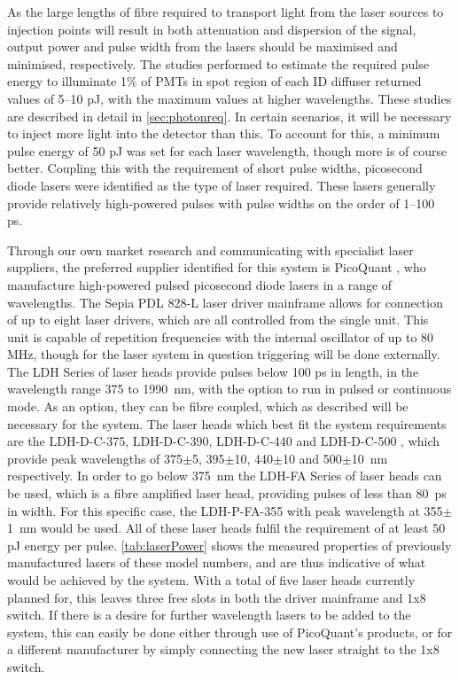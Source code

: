 \documentclass[a4paper,11pt]{article}
\begin{document}
As the large lengths of fibre required to transport light from the laser sources to injection points will result in both attenuation and dispersion of the signal, output power and pulse width from the lasers should be maximised and minimised, respectively. The studies performed to estimate the required pulse energy to illuminate 1\% of PMTs in spot region of each ID diffuser returned values of 5--10 pJ, with the maximum values at higher wavelengths. These studies are described in detail in \cref{sec:photonreq}. In certain scenarios, it will be necessary to inject more light into the detector than this. To account for this, a minimum pulse energy of 50 pJ was set for each laser wavelength, though more is of course better. Coupling this with the requirement of short pulse widths, picosecond diode lasers were identified as the type of laser required. These lasers generally provide relatively high-powered pulses with pulse widths on the order of 1--100 ps.

Through our own market research and communicating with specialist laser suppliers, the preferred supplier identified for this system is PicoQuant \cite{bib:picoquant}, who manufacture high-powered pulsed picosecond diode lasers in a range of wavelengths. The Sepia PDL 828-L laser driver mainframe \cite{bib:laserdriver} allows for connection of up to eight laser drivers, which are all controlled from the single unit. This unit is capable of repetition frequencies with the internal oscillator of up to 80 MHz, though for the laser system in question triggering will be done externally. The LDH Series of laser heads \cite{bib:laserhead} provide pulses below 100 ps in length, in the wavelength range 375 to 1990~nm, with the option to run in pulsed or continuous mode. As an option, they can be fibre coupled, which as described will be necessary for the system. The laser heads which best fit the system requirements are the LDH-D-C-375, LDH-D-C-390, LDH-D-C-440 and LDH-D-C-500 \cite{bib:picoquant}, which provide peak wavelengths of 375$\pm$5, 395$\pm$10, 440$\pm$10 and 500$\pm$10~nm respectively. In order to go below 375~nm the LDH-FA Series of laser heads \cite{bib:LDH} can be used, which is a fibre amplified laser head, providing pulses of less than 80~ps in width. For this specific case, the LDH-P-FA-355 with peak wavelength at 355$\pm$1~nm would be used. All of these laser heads fulfil the requirement of at least 50 pJ energy per pulse. \cref{tab:laserPower} shows the measured properties of previously manufactured lasers of these model numbers, and are thus indicative of what would be achieved by the system. With a total of five laser heads currently planned for, this leaves three free slots in both the driver mainframe and 1x8 switch. If there is a desire for further wavelength lasers to be added to the system, this can easily be done either through use of PicoQuant's products, or for a different manufacturer by simply connecting the new laser straight to the 1x8 switch.
\end{document}
